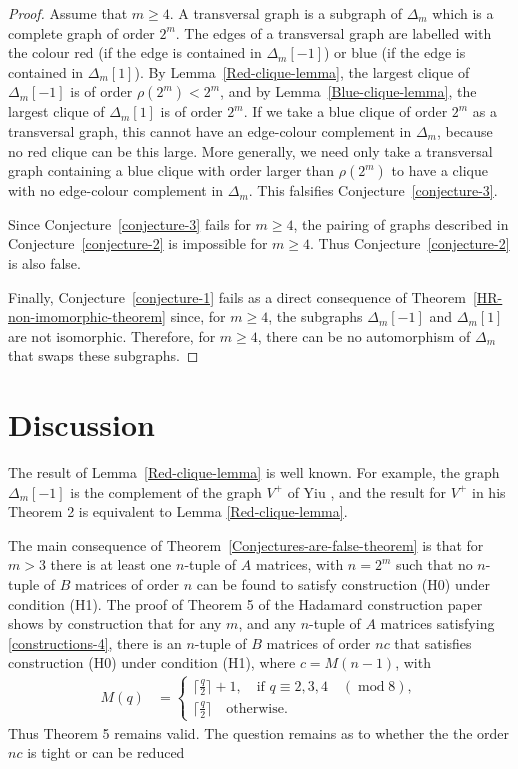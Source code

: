 \documentclass[12pt,a4paper]{article}
\begin{document}
\begin{proof}
Assume that $m \geqslant 4$.
A transversal graph is a subgraph of $\varDelta_m$ which is a complete graph of order $2^m$.
The edges of a transversal graph are labelled with the colour red (if the edge is contained in $\varDelta_m[-1]$) or blue
(if the edge is contained in $\varDelta_m[1]$).
By Lemma~\ref{Red-clique-lemma}, the largest clique of $\varDelta_m[-1]$ is of order $\rho(2^m) < 2^m$,
and by Lemma~\ref{Blue-clique-lemma}, the largest clique of $\varDelta_m[1]$ is of order $2^m$.
If we take a blue clique of order $2^m$ as a transversal graph, this cannot have an edge-colour complement
in $\varDelta_m$, because no red clique can be this large.
More generally, we need only take a transversal graph containing a blue clique with order larger than $\rho(2^m)$ to have a clique with no edge-colour complement
in $\varDelta_m$.
This falsifies Conjecture~\ref{conjecture-3}.

Since Conjecture~\ref{conjecture-3} fails for $m \geqslant 4$, 
the pairing of graphs described in Conjecture~\ref{conjecture-2} is impossible for $m \geqslant 4$.
Thus Conjecture~\ref{conjecture-2} is also false.

Finally, Conjecture~\ref{conjecture-1} fails as a direct consequence of Theorem~\ref{HR-non-imomorphic-theorem}
since, for $m \geqslant 4$, the subgraphs $\varDelta_m[-1]$ and $\varDelta_m[1]$are not isomorphic.
Therefore, for $m \geqslant 4$,  there can be no automorphism of $\varDelta_m$ that swaps these subgraphs. 
\end{proof}

\section{Discussion}
\label{sec-Discussion}
The result of Lemma~\ref{Red-clique-lemma} is well known.
For example, the graph $\varDelta_m[-1]$ is the complement of the graph $V^+$ of Yiu \cite{Yiu90},
and the result for $V^+$ in his Theorem 2 is equivalent to Lemma \ref{Red-clique-lemma}.

The main consequence of Theorem~\ref{Conjectures-are-false-theorem} is that for $m>3$ there is at least one $n$-tuple of $A$ matrices,
with $n=2^m$ such that no $n$-tuple of $B$ matrices of order $n$ can be found to satisfy construction (H0) under condition (H1).
The proof of Theorem 5 of the Hadamard construction paper \cite{Leo14Constructions} shows by construction that for any $m$,
and any $n$-tuple of $A$ matrices satisfying \eqref{constructions-4}, there is an $n$-tuple of $B$ matrices of order $nc$ that 
satisfies construction (H0) under condition (H1), where $c=M(n-1)$, with
\begin{align*}
M(q) &=
\begin{cases}
\lceil \frac{q}{2} \rceil + 1, \quad \text{if~} q \equiv 2,3,4 \quad (\operatorname{mod} 8),
\\
\lceil \frac{q}{2} \rceil \quad \text{otherwise.}
\end{cases}
\end{align*}
Thus Theorem 5 remains valid.
The question remains as to whether the the order $nc$ is tight or can be reduced
\end{document}
